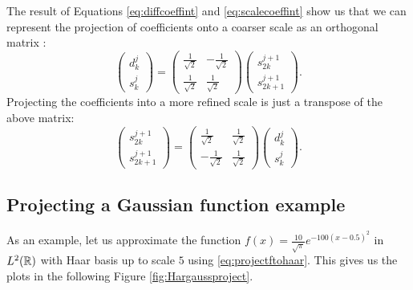 \documentclass[../Thesis.tex]{subfiles}
\begin{document}
The result of Equations \ref{eq:diffcoeffint} and \ref{eq:scalecoeffint} show us
that we can represent the projection of coefficients onto a coarser scale as an
orthogonal matrix \cite{Sorland, Beylkin:MRA}:
\begin{equation}
  \begin{pmatrix}
    d^{j}_k \\
    s^{j}_k
  \end{pmatrix} =
  \begin{pmatrix}
    \frac{1}{\sqrt{2}} & -\frac{1}{\sqrt{2}} \\
    \frac{1}{\sqrt{2}} & \frac{1}{\sqrt{2}}
  \end{pmatrix}
  \begin{pmatrix}
    s^{j+1}_{2k} \\
    s^{j+1}_{2k+1}
  \end{pmatrix}.
\end{equation}
Projecting the coefficients into a more refined scale is just a transpose of the
above matrix:
\begin{equation}
  \begin{pmatrix}
    s^{j+1}_{2k} \\
    s^{j+1}_{2k+1}
  \end{pmatrix} =
  \begin{pmatrix}
    \frac{1}{\sqrt{2}} & \frac{1}{\sqrt{2}} \\
    -\frac{1}{\sqrt{2}} & \frac{1}{\sqrt{2}}
  \end{pmatrix}
  \begin{pmatrix}
    d^{j}_k \\
    s^{j}_k
  \end{pmatrix}.
\end{equation}

\subsection{Projecting a Gaussian function example}
As an example, let us approximate the function
$f(x) = \frac{10}{\sqrt{\pi}}e^{-100(x - 0.5)^2}$ in $L^2(\mathbb{R})$
with Haar basis up to scale $5$ using \ref{eq:projectftohaar}. This gives us the
plots in the following Figure \ref{fig:Hargaussproject}.
\end{document}
